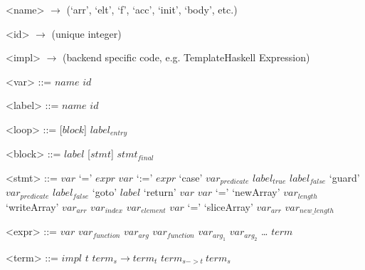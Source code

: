 
\setlength{\grammarindent}{5em} %
\renewcommand{\syntleft}{\normalfont\itshape} %
\renewcommand{\syntright}{}
\renewcommand{\litleft}{\ttfamily} %
\renewcommand{\litright}{}

\setlength{\grammarparsep}{0pt} %
\begin{grammar}
<name> $\rightarrow$ (`arr', `elt', `f', `acc', `init', `body', etc.)

<id>   $\rightarrow$ (unique integer)

<impl> $\rightarrow$ (backend specific code, e.g. TemplateHaskell Expression)

<var>  ::= $name$ $id$

<label> ::= $name$ $id$
\end{grammar}

\setlength{\grammarparsep}{10pt plus 1pt minus 1pt} %
\begin{grammar}
<loop> ::= [$block$] $label_{entry}$

<block> ::= $label$ [$stmt$] $stmt_{final}$

<stmt> ::= $var$ `=' $expr$
      \alt $var$ `:=' $expr$
      \alt `case' $var_{predicate}$ $label_{true}$ $label_{false}$
      \alt `guard' $var_{predicate}$ $label_{false}$
      \alt `goto' $label$
      \alt `return' $var$
      \alt $var$ `=' `newArray' $var_{length}$
      \alt `writeArray' $var_{arr}$ $var_{index}$ $var_{element}$
      \alt $var$ `=' `sliceArray' $var_{arr}$ $var_{new\_length}$

<expr> ::= $var$
      \alt $var_{\mathit{function}}$ $var_{arg}$
      \alt $var_{\mathit{function}}$ $var_{arg_1}$ $var_{arg_2}$
      \alt \ldots
      \alt $term$

<term> ::= $impl$
      \alt $t$
      \alt $term_{s} \rightarrow term_{t}$
      \alt $term_{s->t}\ term_{s}$

\end{grammar}
